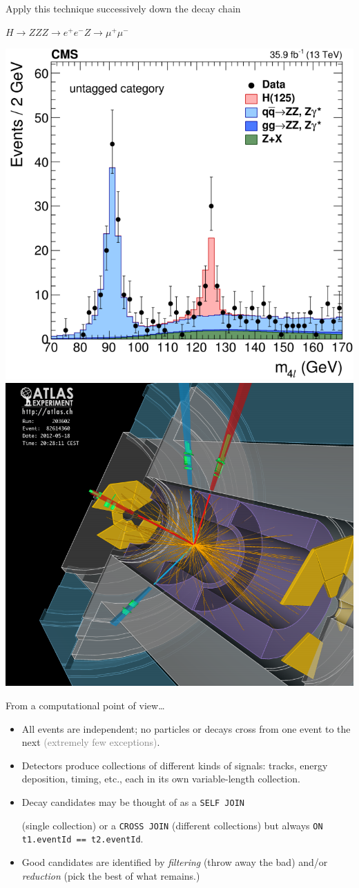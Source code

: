 \documentclass[aspectratio=169]{beamer}
\begin{document}
\begin{frame}{Apply this technique successively down the decay chain}
\Large
\begin{center}
$H \to ZZ$\hspace{1 cm}$Z \to e^+e^-$\hspace{1 cm}$Z \to \mu^+\mu^-$
\end{center}

\includegraphics[height=6 cm]{higgs-to-four-leptons.png}\hfill\includegraphics[height=6 cm]{higgs-to-four-leptons-2.png}
\end{frame}

\begin{frame}{From a computational point of view\ldots}
\Large
\vspace{0.25 cm}
\begin{itemize}\setlength{\itemsep}{0.25 cm}
\item<1-> All events are independent; no particles or decays cross from one event to the next \textcolor{gray}{(extremely few exceptions)}.
\item<2-> Detectors produce collections of different kinds of signals: tracks, energy deposition, timing, etc., each in its own variable-length collection.
\item<3-> Decay candidates may be thought of as a \texttt{SELF JOIN}

(single collection) or a \texttt{CROSS JOIN} (different collections) but always \texttt{ON t1.eventId == t2.eventId}.
\item<4-> Good candidates are identified by {\it filtering} (throw away the bad) and/or {\it reduction} (pick the best of what remains.)
\end{itemize}
\end{frame}
\end{document}
